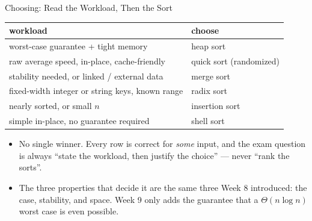 \documentclass[aspectratio=169]{beamer}
\begin{document}
\begin{frame}{Choosing: Read the Workload, Then the Sort}
  \begin{center}
  {\footnotesize
  \begin{tabular}{p{6.6cm} p{5.2cm}}
    \toprule
    \textbf{workload} & \textbf{choose} \\
    \midrule
    worst-case guarantee + tight memory & heap sort \\
    raw average speed, in-place, cache-friendly & quick sort (randomized) \\
    stability needed, or linked / external data & merge sort \\
    fixed-width integer or string keys, known range & radix sort \\
    nearly sorted, or small $n$ & insertion sort \\
    simple in-place, no guarantee required & shell sort \\
    \bottomrule
  \end{tabular}}
  \end{center}
  \begin{itemize}
    \item No single winner. Every row is correct for \emph{some} input, and
      the exam question is always ``state the workload, then justify the
      choice'' --- never ``rank the sorts''.
    \item The three properties that decide it are the same three Week 8
      introduced: the case, stability, and space. Week 9 only adds the
      guarantee that a $\Theta(n\log n)$ worst case is even possible.
  \end{itemize}
\end{frame}
\end{document}
